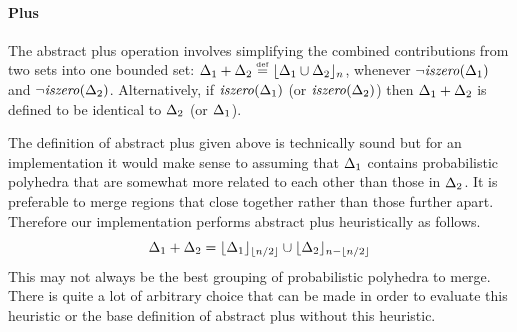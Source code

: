 
\paragraph{Plus} The abstract plus operation involves simplifying
the combined contributions from two sets into one bounded set:
$ \Delta_{1} + \Delta_{2} \stackrel{\smash{\scriptscriptstyle \mathrm{def}}}= \lfloor \Delta_{1} \cup \Delta_{2} \rfloor_{n} $,
whenever $ \neg\mathit{iszero}(\Delta_{1}) $ and $ \neg\mathit{iszero}(\Delta_{2})
$. Alternatively, if $ \mathit{iszero}(\Delta_{1}) $ (or $ \mathit{iszero}(\Delta_{2}) $)
then $ \Delta_{1} + \Delta_{2} $ is defined to be identical to $
\Delta_{2} $ (or $ \Delta_{1} $).

The definition of abstract plus given above is technically sound but
for an implementation it would make sense to assuming that $ \Delta_{1} $
contains probabilistic polyhedra that are somewhat more related to
each other than those in $ \Delta_{2} $. It is preferable to merge
regions that close together rather than those further apart. Therefore
our implementation performs abstract plus heuristically as
follows.
$$ \Delta_{1} + \Delta_{2} = \lfloor \Delta_{1} \rfloor_{\lfloor n/2 \rfloor} \cup
\lfloor \Delta_{2} \rfloor_{n - \lfloor n/2 \rfloor} $$ This may not always be the best
grouping of probabilistic polyhedra to merge. There is quite a lot of
arbitrary choice that can be made in order to evaluate this heuristic
or the base definition of abstract plus without this heuristic.

